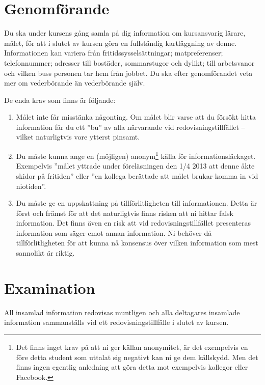 \documentclass[a4paper,nocourse]{miunasgn}
\begin{document}
\section{Genomförande}
\label{sec:work}
\noindent
Du ska under kursens gång samla på dig information om kursansvarig lärare, 
målet, för att i slutet av kursen göra en fullständig kartläggning av denne.
Informationen kan variera från fritidssysselsättningar; matpreferenser; 
telefonnummer; adresser till bostäder, sommarstugor och dylikt; till 
arbetsvanor och vilken buss personen tar hem från jobbet.
Du ska efter genomförandet veta mer om vederbörande än vederbörande själv.

De enda krav som finns är följande:
\begin{enumerate}
  \item Målet inte får misstänka någonting.
    Om målet blir varse att du försökt hitta information får du ett ''bu'' av 
    alla närvarande vid redovisningstillfället -- vilket naturligtvis vore 
    ytterst pinsamt.
  \item Du måste kunna ange en (möjligen) anonym\footnote{%
      Det finns inget krav på att ni ger källan anonymitet, är det exempelvis 
      en före detta student som uttalat sig negativt kan ni ge dem källskydd.
      Men det finns ingen egentlig anledning att göra detta mot exempelvis 
      kollegor eller Facebook.
    } källa för informationsläckaget.
    Exempelvis ''målet yttrade under föreläsningen den 1/4 2013 att denne åkte 
    skidor på fritiden'' eller ''en kollega berättade att målet brukar komma in 
    vid niotiden''.
  \item Du måste ge en uppskattning på tillförlitligheten till informationen.
    Detta är först och främst för att det naturligtvis finns risken att ni 
    hittar falsk information.
    Det finns även en risk att vid redovisningstillfället presenteras 
    information som säger emot annan information.
    Ni behöver då tillförlitligheten för att kunna nå konsensus över vilken 
    information som mest sannolikt är riktig.
\end{enumerate}


\section{Examination}
\label{sec:Examination}
\noindent
All insamlad information redovisas muntligen och alla deltagares insamlade 
information sammanställs vid ett redovisningstillfälle i slutet av kursen.



\end{document}
